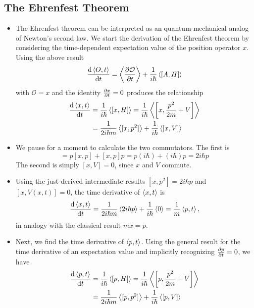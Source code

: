 \documentclass[11pt, a4paper]{article}
\renewcommand{\O}{\mathcal{O}}  %
\begin{document}
\subsection{The Ehrenfest Theorem}
\begin{itemize}
	\item The Ehrenfest theorem can be interpreted as an quantum-mechanical analog of Newton's second law. We start the derivation of the Ehrenfest theorem by considering the time-dependent expectation value of the position operator $ x $.  Using the above result 
	\begin{equation*}
		\dv{\ev{O, t}}{t} =  \ev{\pdv{\O}{t}} + \frac{1}{i\hbar}\ev{[A, H]}
	\end{equation*}
	with $ \O = x $ and the identity $ \pdv{x}{t} = 0 $ produces the relationship
	\begin{align*}
		\dv{\ev{x, t}}{t} &= \frac{1}{i\hbar}\ev{[x, H]} = \frac{1}{i\hbar}\ev{\left[x, \frac{p^{2}}{2m} + V\right]}\\
		& = \frac{1}{2i\hbar m} \ev{[x, p^{2}]} + \frac{1}{i\hbar}\ev{[x, V]}
	\end{align*}
	
	\item We pause for a moment to calculate the two commutators. The first is
	\begin{equation*}
		[x, p^{2}] = p[x, p] + [x, p]p = p(i\hbar) + (i\hbar) p = 2i \hbar p
	\end{equation*}
	The second is simply $ [x, V] = 0 $, since $ x $ and $ V $ commute. 
	
	\item Using the just-derived intermediate results $ [x, p^{2}] = 2i\hbar p $ and $ [x, V(x, t)] = 0 $, the time derivative of $ \ev{x, t} $ is 
	\begin{equation*}
		\dv{\ev{x, t}}{t} = \frac{1}{2i\hbar m} \ev{2 i\hbar p} + \frac{1}{i\hbar}\ev{0} = \frac{1}{m}\ev{p, t},
	\end{equation*}
	in analogy with the classical result $ m \dot{x} = p $. 
	
	\item Next, we find the time derivative of $ \ev{p, t} $. Using the general result for the time derivative of an expectation value and implicitly recognizing $ \pdv{p}{t} = 0 $, we have
	\begin{align*}
		\dv{\ev{p, t}}{t} &= \frac{1}{i\hbar}\ev{[p, H]} = \frac{1}{i\hbar}\ev{\left[p, \frac{p^{2}}{2m} + V\right]}\\
		&= \frac{1}{2i \hbar m}\ev{[p, p^{2}]} + \frac{1}{i\hbar} \ev{[p, V]}
	\end{align*}
	

\end{itemize}
\end{document}
